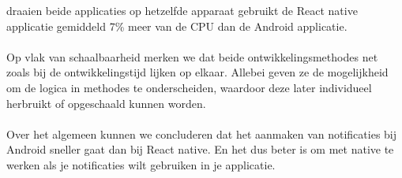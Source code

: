 draaien beide applicaties op hetzelfde apparaat gebruikt de React native applicatie gemiddeld 7\% meer 
van de CPU dan de Android applicatie.
\\\\
Op vlak van schaalbaarheid merken we dat beide ontwikkelingsmethodes net zoals bij de ontwikkelingstijd 
lijken op elkaar. Allebei geven ze de mogelijkheid om de logica in methodes te onderscheiden, 
waardoor deze later individueel herbruikt of opgeschaald kunnen worden.
\\\\
Over het algemeen kunnen we concluderen dat het aanmaken van notificaties bij Android sneller gaat dan bij
React native. En het dus beter is om met native te werken als je notificaties wilt gebruiken in je applicatie.























